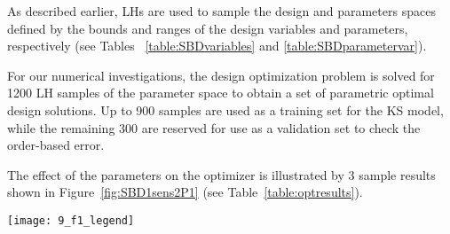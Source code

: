 As described earlier, \acp{LH} are used to sample the design and parameters spaces defined by the bounds and ranges of the design variables and parameters, respectively (see Tables 
~\ref{table:SBDvariables} and \ref{table:SBDparametervar}).

For our numerical investigations, the design optimization problem is solved for 1200 \ac{LH} samples of the parameter space to obtain a set of parametric optimal design solutions. Up to 900 samples are used as a training set for the \ac{KS} model, while the remaining 300 are reserved for use as a validation set to check the order-based error.

The effect of the parameters on the optimizer is illustrated by 3 sample results shown in Figure~\ref{fig:SBD1sens2P1} (see Table~\ref{table:optresults}).

\begin{figure*}%
	\centering
	\texttt{[image: 9\_f1\_legend]} \vspace{-0.02\textwidth}\\
	 \hspace{0.03\textwidth}%
	 \hspace{0.03\textwidth}%
	\caption{Three sample parametric optimal designs; $x_0$ denotes the baseline design}
	\label{fig:SBD1sens2P1}
\end{figure*}
